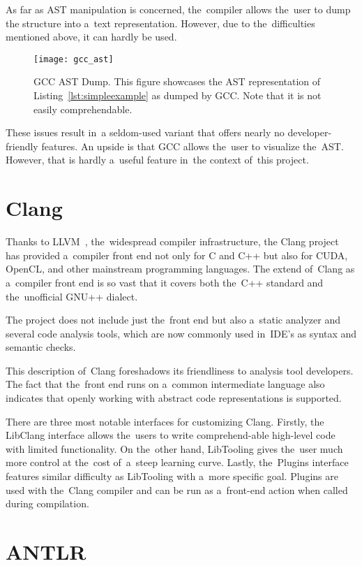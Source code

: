 As far as AST manipulation is concerned, the~compiler allows the~user to dump 
the structure into a~text representation. 
However, due to the~difficulties mentioned above, it can hardly be used.

\begin{figure}[p]\centering
\texttt{[image: gcc\_ast]}
\caption{GCC AST Dump. This figure showcases 
the AST representation of Listing~\ref{lst:simpleexample}
as dumped by GCC. Note that it is not easily comprehendable.}
\label{img:gcc}
\end{figure}

These issues result in~a seldom-used variant that offers nearly 
no developer-friendly features. 
An upside is that GCC allows the~user to visualize the~AST. 
However, that is hardly a~useful feature in~the context of~this project.

\section{Clang}

Thanks to LLVM~\citep{llvm:online}, the~widespread compiler infrastructure,
the Clang project~\citep{clang:online}
has provided a~compiler front end not only for C and C++ but also 
for CUDA, OpenCL, and other mainstream programming languages. 
The extend of~Clang as a~compiler front end is so vast that it covers 
both the~C++ standard and the~unofficial GNU++ dialect.

The project does not include just the~front end but also a~static analyzer 
and several code analysis tools, which are now commonly used in~IDE's as 
syntax and semantic checks. 

This description of~Clang foreshadows its friendliness to analysis tool developers. 
The fact that the~front end runs on a~common intermediate language also indicates 
that openly working with abstract code representations is supported.

There are three most notable interfaces for customizing Clang. 
Firstly, the LibClang interface allows the~users to write 
comprehend-able high-level code with limited functionality. 
On the~other hand, LibTooling gives the~user much more control 
at the~cost of~a~steep learning curve. 
Lastly, the~Plugins interface features similar difficulty 
as LibTooling with a~more specific goal. 
Plugins are used with the~Clang compiler and can be run 
as a~front-end action when called during compilation.

\section{ANTLR}

